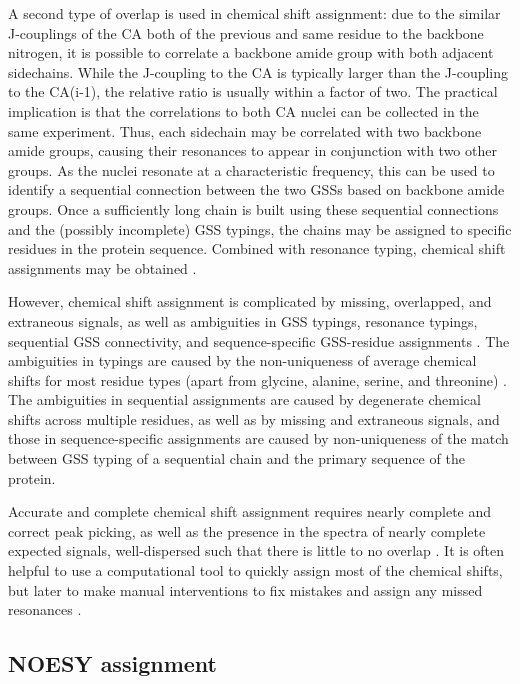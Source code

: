 A second type of overlap is used in chemical shift assignment: due to the 
similar J-couplings of the CA both of the previous and same residue to the
backbone nitrogen, it is possible to correlate a backbone amide group with
both adjacent sidechains.  While the J-coupling to the CA is typically larger
than the J-coupling to the CA(i-1), the relative ratio is usually within a 
factor of two.  The practical implication is that the correlations to both
CA nuclei can be collected in the same experiment.
Thus, each sidechain may be correlated with two
backbone amide groups, causing their resonances to appear in conjunction with
two other groups.  As the nuclei resonate at a characteristic frequency, this
can be used to identify a sequential connection between the two GSSs based on
backbone amide groups.  Once a sufficiently long chain is built using these
sequential connections and the (possibly incomplete) GSS typings, the chains 
may be assigned to specific residues in the protein sequence.  Combined with
resonance typing, chemical shift assignments may be obtained
\cite{hnco, hncacb, cbcaconh}.

However, chemical shift assignment is complicated by missing, overlapped, and
extraneous signals, as well as ambiguities in GSS typings, resonance typings,
sequential GSS connectivity, and sequence-specific GSS-residue assignments
\cite{williamson2009automated, guerry2011automated}.
The ambiguities in typings are caused by the non-uniqueness of average chemical
shifts for most residue types (apart from glycine, alanine, serine, and 
threonine) \cite{bmrb}.  The ambiguities in sequential
assignments are caused by degenerate chemical shifts across multiple residues,
as well as by missing and extraneous signals, and those in sequence-specific
assignments are caused by non-uniqueness of the match between GSS typing
of a sequential chain and the primary sequence of the protein.

Accurate and complete chemical shift assignment requires nearly complete and
correct peak picking, as well as the presence in the spectra of nearly complete
expected signals, well-dispersed such that there is little to no overlap
\cite{guntert2009automated, guerry2011automated}.
It is often helpful to use a computational tool to quickly assign most of the
chemical shifts, but later to make manual interventions to fix mistakes and
assign any missed resonances \cite{baran2004automated}.

\subsection*{NOESY assignment}

